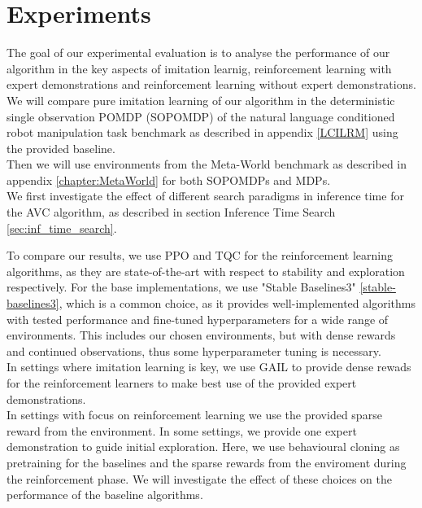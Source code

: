 
\chapter{Experiments}
\label{chapter:Experiments}
The goal of our experimental evaluation is to analyse the performance of our algorithm in the key aspects of 
imitation learnig, reinforcement learning with expert demonstrations and reinforcement learning without expert demonstrations. \\

We will compare pure imitation learning of our algorithm in the deterministic single observation POMDP (SOPOMDP) of the 
natural language conditioned robot manipulation task benchmark as described in appendix \ref{LCILRM} using the provided baseline.\\

Then we will use environments from the Meta-World benchmark as described in appendix \ref{chapter:MetaWorld} for both SOPOMDPs and MDPs.\\

We first investigate the effect of different search paradigms in inference time for the AVC algorithm, as described in section Inference Time Search \ref{sec:inf_time_search}.

To compare our results, we use PPO and TQC for the reinforcement learning algorithms, as they are state-of-the-art with respect to stability and 
exploration respectively. For the base implementations, we use "Stable Baselines3" \ref{stable-baselines3}, which is a common choice, as it provides well-implemented algorithms with tested
performance and fine-tuned hyperparameters for a wide range of environments. This includes our chosen environments, but with dense rewards and continued observations,
thus some hyperparameter tuning is necessary.\\

In settings where imitation learning is key, we use GAIL to provide dense rewads for the reinforcement learners to make best use of the provided expert demonstrations. \\

In settings with focus on reinforcement learning we use the provided sparse reward from the environment. In some settings, we provide one 
expert demonstration to guide initial exploration. Here, we use behavioural cloning as pretraining for the baselines and the sparse rewards from the enviroment during the reinforcement phase. 
We will investigate the effect of these choices on the performance of the baseline algorithms.\\

